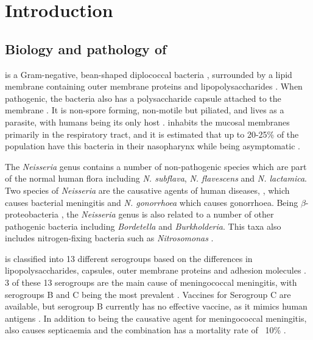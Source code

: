 \chapter{Introduction}

\section{Biology and pathology of \Nsm}
\Nsm\space is a Gram-negative, bean-shaped diplococcal bacteria \cite{MarcelvanDeuren01012000}, surrounded by a lipid membrane containing outer membrane proteins and lipopolysaccharides \cite{MarcelvanDeuren01012000}. When pathogenic, the bacteria also has a polysaccharide capsule attached to the membrane \cite{MarcelvanDeuren01012000}. It is non-spore forming, non-motile but piliated, and lives as a parasite, with humans being its only host \cite{Stephens2009B71}. \Nm\space inhabits the mucosal membranes primarily in the respiratory tract, and it is estimated that up to 20-25\% of the population have this bacteria in their nasopharynx while being asymptomatic \cite{NancyE.Rosenstein05032001,Stephens2009B71,IWDeVoe06011982}.

The \textit{Neisseria} genus contains a number of non-pathogenic species which are part of the normal human flora including \textit{N. subflava},  \textit{N. flavescens} and \textit{N. lactamica}. Two species of \textit{Neisseria} are the causative agents of human diseases, \Nm, which causes bacterial meningitis and \textit{N. gonorrhoea} which causes gonorrhoea. Being $\beta$-proteobacteria \cite{Stephens2009B71}, the \textit{Neisseria} genus is also related to a number of other pathogenic bacteria including \textit{Bordetella} and \textit{Burkholderia}. This taxa also includes nitrogen-fixing bacteria such as \textit{Nitrosomonas} \cite{Madigan2005}.

\Nm\space is classified into 13 different serogroups based on the differences in lipopolysaccharides, capsules, outer membrane proteins and adhesion molecules \cite{Stephens2009B71,MarcelvanDeuren01012000,Carbonnelle2009B78}. 3 of these 13 serogroups are the main cause of meningococcal meningitis, with serogroups B and C being the most prevalent \cite{MarcelvanDeuren01012000}. Vaccines for Serogroup C are available, but serogroup B currently has no effective vaccine, as it mimics human antigens \cite{Stephens2009B71}. In addition to being the causative agent for meningococcal meningitis, \Nm\space also causes septicaemia and the combination has a mortality rate of ~10\% \cite{MarcelvanDeuren01012000,Stephens2009B71}.

